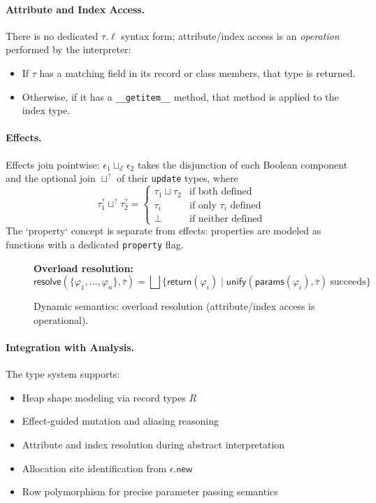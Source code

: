 \paragraph{Attribute and Index Access.}  
There is no dedicated $\tau.\ell$ syntax form; attribute/index access is an \emph{operation} performed by the interpreter:  
\begin{itemize}
\item If $\tau$ has a matching field in its record or class members, that type is returned.
\item Otherwise, if it has a \texttt{\_\_getitem\_\_} method, that method is applied to the index type.
\end{itemize}

\paragraph{Effects.}  
Effects join pointwise: $\epsilon_1 \sqcup_{\mathcal{E}} \epsilon_2$ 
takes the disjunction of each Boolean component and the optional join $\sqcup^?$ of their \texttt{update} types, where
\[
\tau_1^? \sqcup^? \tau_2^? =
\begin{cases}
\tau_1 \sqcup \tau_2 & \text{if both defined} \\
\tau_i & \text{if only } \tau_i \text{ defined} \\
\bot & \text{if neither defined}
\end{cases}
\]
The `property` concept is separate from effects: properties are modeled as functions with a dedicated \texttt{property} flag.

\begin{figure*}[t]
\centering
\textbf{Overload resolution:}
\[
\mathsf{resolve}(\{\varphi_1, \ldots, \varphi_n\}, \overline{\tau}) =
\bigsqcup\{\mathsf{return}(\varphi_i) \mid \mathsf{unify}(\mathsf{params}(\varphi_i), \overline{\tau}) \ \text{succeeds}\}
\]
\caption{Dynamic semantics: overload resolution (attribute/index access is operational).}
\label{fig:dynamic}
\end{figure*}

\paragraph{Integration with Analysis.}  
The type system supports:
\begin{itemize}
\item Heap shape modeling via record types $R$
\item Effect‐guided mutation and aliasing reasoning
\item Attribute and index resolution during abstract interpretation
\item Allocation site identification from $\epsilon.\mathsf{new}$
\item Row polymorphism for precise parameter passing semantics
\end{itemize}

